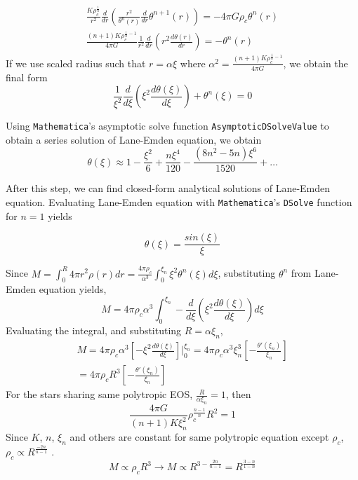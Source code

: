 \documentclass[aps,twocolumn,showpacs,preprintnumbers,nofootinbib,prl,superscriptaddress,groupedaddress]{revtex4-2}
\begin{document}
\begin{align}
	\frac{K\rho_c^{\frac{1}{n}}}{r^2}\frac{d}{dr}(\frac{r^2}{\theta^n(r)}\frac{d}{dr}\theta^{n+1}(r)) = -4\pi G  \rho_c\theta^n(r) \\
	\frac{(n+1)K\rho_c^{\frac{1}{n}-1}}{4\pi G  }\frac{1}{r^2}\frac{d}{dr}(r^2\frac{d\theta(r)}{dr}) = -\theta^n(r)
\end{align}
If we use scaled radius such that $r = \alpha \xi$  where $\alpha^2 = \frac{(n+1)K\rho_c^{\frac{1}{n}-1}}{4\pi G  }$, we obtain the final form
\begin{equation}
	\frac{1}{\xi^2}\frac{d}{d\xi}(\xi^2\frac{d\theta(\xi)}{d\xi}) + \theta^n(\xi) = 0
\end{equation}

Using \texttt{Mathematica}'s asymptotic solve function \texttt{AsymptoticDSolveValue} to obtain a series solution of Lane-Emden equation, we obtain
\begin{equation}
\theta(\xi) \approx 1 - \frac{\xi^2}{6}+\frac{n\xi^4}{120}-\frac{(8n^2-5n)\xi^6}{1520}+\dots
\end{equation}

After this step, we can find closed-form analytical solutions of Lane-Emden equation. Evaluating Lane-Emden equation with \texttt{Mathematica}'s \texttt{DSolve} function for $n=1$ yields

\begin{equation}
	\theta(\xi) = \frac{sin(\xi)}{\xi}
\end{equation}


Since $M = \int_0^R 4\pi r^2\rho(r)dr = \frac{4\pi \rho_c}{\alpha^3}\int_0^{\xi_n} \xi^2\theta^n(\xi)d\xi$, substituting $\theta^n$ from Lane-Emden equation yields,
\begin{equation}
	M = 4\pi \rho_c\alpha^3\int_0^{\xi_n} -\frac{d}{d\xi}(\xi^2\frac{d\theta(\xi)}{d\xi})d\xi
\end{equation}
Evaluating the integral, and substituting $R = \alpha\xi_n$,
\begin{align}
&	M = 4\pi \rho_c\alpha^3[-\xi^2\frac{d\theta(\xi)}{d\xi}]\bigg|_0^{\xi_n} = 4\pi \rho_c\alpha^3\xi^3_n[-\frac{\theta'(\xi_n)}{\xi_n}] & \\
	&= 4\pi \rho_cR^3[-\frac{\theta'(\xi_n)}{\xi_n}] \label{eq13} & 
\end{align}
For the stars sharing same polytropic EOS, $\frac{R}{\alpha\xi_n}=1$, then
\begin{equation}
	\frac{4\pi G}{(n+1)K \xi_n^2}\rho_c^{\frac{n-1}{n}}R^2 =1
\end{equation}
Since $K$, $n$, $\xi_n$ and others are constant for same polytropic equation except $\rho_c$, $\rho_c \propto R^{\frac{-2n}{n-1}}$ . \\
\begin{equation}
	M \propto \rho_cR^3 \to M \propto R^{3-\frac{2n}{n-1}}=R^{\frac{3-n}{1-n}}
\end{equation}
\end{document}
